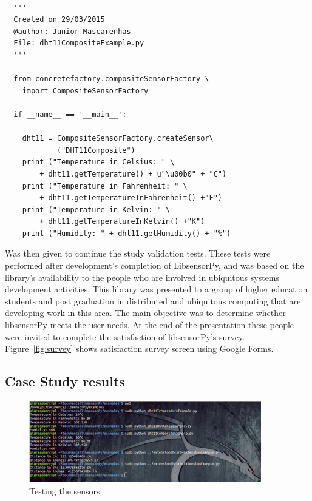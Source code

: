 \documentclass{acm_proc_article-sp}
\begin{document}
\renewcommand{\theFancyVerbLine}{
  \sffamily\textcolor[rgb]{0.5,0.5,0.5}{\scriptsize\arabic{FancyVerbLine}}}
\begin{verbatim}

  '''
  Created on 29/03/2015
  @author: Junior Mascarenhas
  File: dht11CompositeExample.py
  '''
  
  from concretefactory.compositeSensorFactory \
  	import CompositeSensorFactory

  if __name__ == '__main__':

    dht11 = CompositeSensorFactory.createSensor\
    	    ("DHT11Composite")
    print ("Temperature in Celsius: " \
    	+ dht11.getTemperature() + u"\u00b0" + "C")
    print ("Temperature in Fahrenheit: " \
    	+ dht11.getTemperatureInFahrenheit() +"F")
    print ("Temperature in Kelvin: " \
    	+ dht11.getTemperatureInKelvin() +"K")
    print ("Humidity: " + dht11.getHumidity() + "%")
\end{verbatim}
Was then given to continue the study validation tests. These tests were performed after development's completion of LibsensorPy, and was based on the library's availability to the people who are involved in ubiquitous systems development activities.
\newline
\newline
This library was presented to a group of higher education students and post graduation in distributed and ubiquitous computing that are developing work in this area. The main objective was to determine whether libsensorPy meets the user needs.
\newline
\newline
At the end of the presentation these people were invited to complete the satisfaction of libsensorPy's survey. Figure~\ref{fig:survey} shows satisfaction survey screen using Google Forms.


\subsection{Case Study results}
\begin{figure}[ht]
    \centering
    	\includegraphics[width=0.9\textwidth]{pictures/tests.png}
    		\caption{Testing the sensors}  
    		\label{fig:results}  	
\end{figure}
\end{document}
